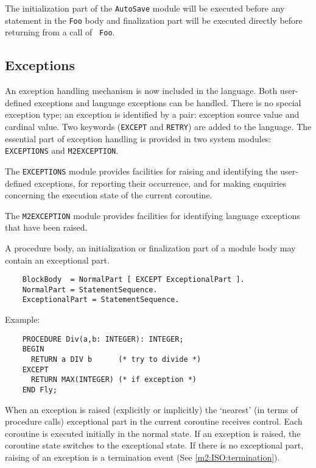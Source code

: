 The initialization part of the {\tt AutoSave} module will be
executed before any statement in the {\tt Foo} body and finalization
part will be executed directly before returning from a call of {\tt
Foo}.

\subsection{Exceptions}\label{m2:ISO:exc}

An exception handling mechanism is now included in the language.
Both user-defined exceptions and language exceptions can be
handled. There is no special exception type; an exception is
identified by a pair: exception source value and cardinal
value. Two keywords (\verb'EXCEPT' and \verb'RETRY') are added to the
language. The essential part of exception handling is provided in
two system modules: {\tt EXCEPTIONS} and {\tt M2EXCEPTION}.

The {\tt EXCEPTIONS} module provides facilities for raising and
identifying the user-defined exceptions, for reporting their
occurrence, and for making enquiries concerning the execution
state of the current coroutine.

The {\tt M2EXCEPTION} module provides facilities for identifying
language exceptions that have been raised.

A procedure body, an initialization or finalization part of a module
body may contain an exceptional part.
\begin{verbatim}
    BlockBody  = NormalPart [ EXCEPT ExceptionalPart ].
    NormalPart = StatementSequence.
    ExceptionalPart = StatementSequence.
\end{verbatim}

Example:

\begin{verbatim}
    PROCEDURE Div(a,b: INTEGER): INTEGER;
    BEGIN
      RETURN a DIV b      (* try to divide *)
    EXCEPT
      RETURN MAX(INTEGER) (* if exception *)
    END Fly;
\end{verbatim}

When an exception is raised (explicitly or implicitly) the
`nearest' (in terms of procedure calls) exceptional part in the
current coroutine receives control. Each coroutine is
executed initially in the normal state. If an exception is raised, the
coroutine state switches to the exceptional state. If there is no
exceptional part, raising of an exception is a termination event
(See \ref{m2:ISO:termination}).

